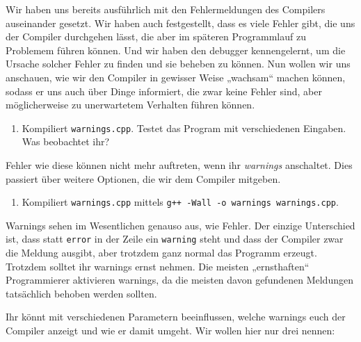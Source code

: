 
Wir haben uns bereits ausführlich mit den Fehlermeldungen des Compilers
auseinander gesetzt. Wir haben auch festgestellt, dass es viele Fehler gibt,
die uns der Compiler durchgehen lässt, die aber im späteren Programmlauf zu
Problemem führen können. Und wir haben den debugger kennengelernt, um die
Ursache solcher Fehler zu finden und sie beheben zu können. Nun wollen wir uns
anschauen, wie wir den Compiler in gewisser Weise „wachsam“ machen können,
sodass er uns auch über Dinge informiert, die zwar keine Fehler sind, aber
möglicherweise zu unerwartetem Verhalten führen können.

\begin{praxis}
	\begin{enumerate}
		\item Kompiliert \texttt{warnings.cpp}. Testet das Program mit
		      verschiedenen Eingaben. Was beobachtet ihr?
	\end{enumerate}

	Fehler wie diese können nicht mehr auftreten, wenn ihr \emph{warnings}
	anschaltet. Dies passiert über weitere Optionen, die wir dem Compiler mitgeben.

	\begin{enumerate}[resume]
		\item Kompiliert \texttt{warnings.cpp} mittels \texttt{g++ -Wall -o
			      warnings warnings.cpp}.
	\end{enumerate}

	Warnings sehen im Wesentlichen genauso aus, wie Fehler. Der einzige Unterschied
	ist, dass statt \texttt{error} in der Zeile ein \texttt{warning} steht und dass
	der Compiler zwar die Meldung ausgibt, aber trotzdem ganz normal das Programm
	erzeugt. Trotzdem solltet ihr warnings ernst nehmen. Die meisten „ernsthaften“
	Programmierer aktivieren warnings, da die meisten davon gefundenen Meldungen
	tatsächlich behoben werden sollten.

	Ihr könnt mit verschiedenen Parametern beeinflussen, welche warnings euch der
	Compiler anzeigt und wie er damit umgeht. Wir wollen hier nur drei nennen:


\end{praxis}
